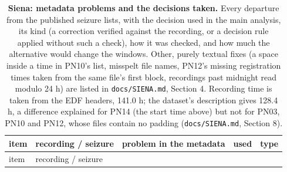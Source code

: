 \documentclass[11pt,a4paper]{article}
\begin{document}
\endgroup

\begingroup\small

\begin{longtable}[]{@{}
  >{\raggedright\arraybackslash}p{}
  >{\raggedright\arraybackslash}p{}
  >{\raggedright\arraybackslash}p{}
  >{\raggedright\arraybackslash}p{}
  >{\raggedright\arraybackslash}p{}@{}}
\caption{\textbf{Siena: metadata problems and the decisions taken.} Every departure from the published seizure lists, with the decision used in the main analysis, its kind (a correction verified against the recording, or a decision rule applied without such a check), how it was checked, and how much the alternative would change the windows. Other, purely textual fixes (a space inside a time in PN10's list, misspelt file names, PN12's missing registration times taken from the same file's first block, recordings past midnight read modulo 24 h) are listed in \nolinkurl{docs/SIENA.md}, Section 4. Recording time is taken from the EDF headers, 141.0 h; the dataset's description gives 128.4 h, a difference explained for PN14 (the start time above) but not for PN03, PN10 and PN12, whose files contain no padding (\nolinkurl{docs/SIENA.md}, Section 8).}\tabularnewline
\toprule\noalign{}
\begin{minipage}[b]{\linewidth}\raggedright
item
\end{minipage} & \begin{minipage}[b]{\linewidth}\raggedright
recording / seizure
\end{minipage} & \begin{minipage}[b]{\linewidth}\raggedright
problem in the metadata
\end{minipage} & \begin{minipage}[b]{\linewidth}\raggedright
used
\end{minipage} & \begin{minipage}[b]{\linewidth}\raggedright
type
\end{minipage} \\
\midrule\noalign{}
\endfirsthead
\toprule\noalign{}
\begin{minipage}[b]{\linewidth}\raggedright
item
\end{minipage} & \begin{minipage}[b]{\linewidth}\raggedright
recording / seizure
\end{minipage} & \begin{minipage}[b]{\linewidth}\raggedright

\end{minipage}
\end{longtable}
\end{document}
